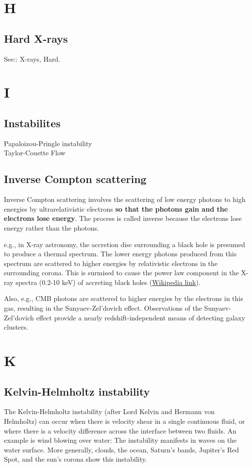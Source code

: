 \documentclass[11pt]{article}
\begin{document}
\section*{H}
    \subsection*{Hard X-rays}
    See:: X-rays, Hard. 

\section*{I}
    \subsection*{Instabilites}
    Papaloizou-Pringle instability\\
    Taylor-Couette Flow\\

    \subsection*{Inverse Compton scattering}
    Inverse Compton scattering involves the scattering of low energy
    photons to high energies by ultrarelativistic electrons {\bf so that
      the photons gain and the electrons lose energy}. The process is called
    inverse because the electrons lose energy rather than the photons.

    e.g., in X-ray astronomy, the accretion disc surrounding a black
    hole is presumed to produce a thermal spectrum. The lower energy
    photons produced from this spectrum are scattered to higher energies
    by relativistic electrons in the surrounding corona. This is surmised
    to cause the power law component in the X-ray spectra (0.2-10 keV) of
    accreting black holes (\href{https://en.wikipedia.org/wiki/Compton\_scattering}{Wikipedia link}).

    Also, e.g., CMB photons are scattered to higher energies by the
    electrons in this gas, resulting in the Sunyaev-Zel'dovich
    effect. Observations of the Sunyaev-Zel'dovich effect provide a nearly
    redshift-independent means of detecting galaxy clusters.

\section*{K}
\subsection*{Kelvin-Helmholtz instability}
The Kelvin-Helmholtz instability (after Lord Kelvin and Hermann von
Helmholtz) can occur when there is velocity shear in a single
continuous fluid, or where there is a velocity difference across the
interface between two fluids. An example is wind blowing over water:
The instability manifests in waves on the water surface. More
generally, clouds, the ocean, Saturn's bands, Jupiter's Red Spot, and
the sun's corona show this instability. 
\end{document}

